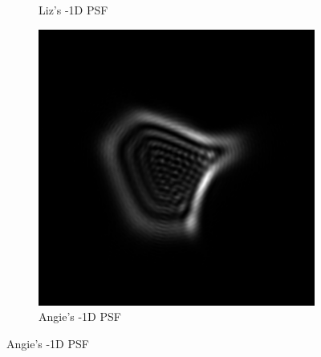\documentclass{article}
\begin{document}
\begin{figure}[H]
\begin{subfigure}{.3\textwidth}
  \caption{Liz's -1D PSF}
  \label{fig:lizn1dpsf}
\end{subfigure}
\begin{subfigure}{.3\textwidth}
  \centering
  \includegraphics[width=1\linewidth]{Angie_R_0526_1_500_zer_-1_5_PSF.png}
  \caption{Angie's -1D PSF}
  \label{fig:angien1dpsf}
\end{subfigure}

\medskip


\end{figure}
\end{document}
